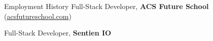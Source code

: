 \begin{rubric}{Employment History}
%
	Full-Stack Developer, \textbf{ACS Future School} (\href{https://www.acsfutureschool.com}{acsfutureschool.com})

%
	Full-Stack Developer, \textbf{Sentien IO}

\end{rubric}